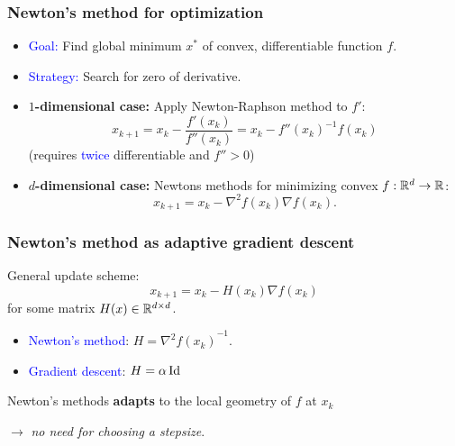 \documentclass{beamer}
\begin{document}
\begin{frame}
  \frametitle{Newton's method for optimization}
  \begin{itemize}
    \item \textcolor{blue}{Goal:} Find global minimum $x^*$ of convex, differentiable function $f$.
    \item \textcolor{blue}{Strategy:} Search for zero of derivative.
    \item \textbf{$1$-dimensional case:} Apply Newton-Raphson method to $f'$:
          \begin{equation}
            x_{k+1} = x_k - \frac{f'(x_k)}{f''(x_k)} = x_k - {f''(x_k)}^{-1} f(x_k)
          \end{equation}
          (requires \textcolor{blue}{twice} differentiable and $f'' > 0$)

    \item \textbf{$d$-dimensional case:} Newtons methods for minimizing convex $f: \mathbb{R}^d \to \mathbb{R}$:
          \begin{equation}
            x_{k+1} = x_k - \nabla^2 f(x_k) \nabla f(x_k).
          \end{equation}
  \end{itemize}
\end{frame}


\begin{frame}
  \frametitle{Newton's method as adaptive gradient descent}
  General update scheme:
  \begin{equation}
    x_{k+1} = x_k - H(x_k) \nabla f(x_k)
  \end{equation}
  for some matrix $H(x) \in \mathbb{R}^{d \times d}$.
  \begin{itemize}
    \item \textcolor{blue}{Newton's method}: $H = {\nabla^2 f(x_k)}^{-1}$.
    \item \textcolor{blue}{Gradient descent}: $H = \alpha \operatorname*{Id}$
  \end{itemize}
  \vspace{1cm}
 \begin{block}{}
  Newton's methods \textbf{adapts} to the local geometry of $f$ at $x_k$ \\
 \end{block}
  $\rightarrow$ \textit{no need for choosing a stepsize}.
\end{frame}
\end{document}
